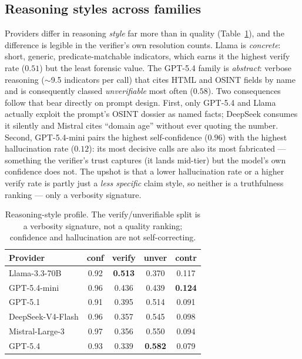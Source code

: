 \subsection{Reasoning styles across families}
\label{app:bench-style}

Providers differ in reasoning \emph{style} far more than in quality
(Table~\ref{tab:bench-style}), and the difference is legible in the verifier's
own resolution counts. Llama is \emph{concrete}: short, generic,
predicate-matchable indicators, which earns it the highest verify rate ($0.51$)
but the least forensic value. The GPT-5.4 family is \emph{abstract}: verbose
reasoning ($\sim$9.5 indicators per call) that cites HTML and OSINT fields by name
and is consequently classed \emph{unverifiable} most often ($0.58$). Two
consequences follow that bear directly on prompt design. First, only GPT-5.4 and
Llama actually exploit the prompt's OSINT dossier as named facts; DeepSeek
consumes it silently and Mistral cites ``domain age'' without ever quoting the
number. Second, GPT-5.4-mini pairs the highest self-confidence ($0.96$) with the
highest hallucination rate ($0.12$): its most decisive calls are also its most
fabricated --- something the verifier's trust captures (it lands mid-tier) but the
model's own confidence does not. The upshot is that a lower hallucination rate or
a higher verify rate is partly just a \emph{less specific} claim style, so neither
is a truthfulness ranking --- only a verbosity signature.

\begin{table}[h]
\centering
\caption{Reasoning-style profile. The verify/unverifiable split is a verbosity
signature, not a quality ranking; confidence and hallucination are not
self-correcting.}
\label{tab:bench-style}
\small
\begin{tabular}{@{}lcccc@{}}
\toprule
Provider & conf & verify & unver & contr \\
\midrule
Llama-3.3-70B     & 0.92 & \textbf{0.513} & 0.370 & 0.117 \\
GPT-5.4-mini      & 0.96 & 0.436 & 0.439 & \textbf{0.124} \\
GPT-5.1           & 0.91 & 0.395 & 0.514 & 0.091 \\
DeepSeek-V4-Flash & 0.96 & 0.357 & 0.545 & 0.098 \\
Mistral-Large-3   & 0.97 & 0.356 & 0.550 & 0.094 \\
GPT-5.4           & 0.93 & 0.339 & \textbf{0.582} & 0.079 \\
\bottomrule
\end{tabular}
\end{table}

